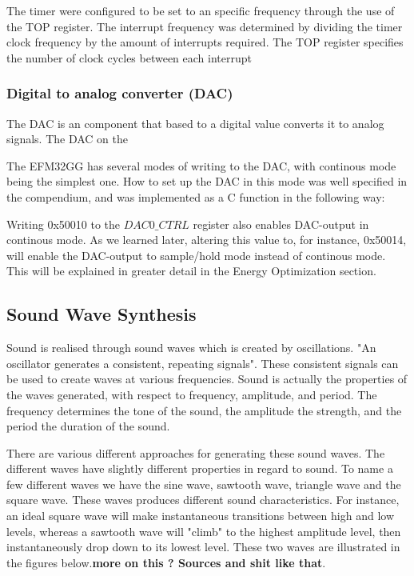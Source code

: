 The timer were configured to be set to an specific frequency through the use of the TOP register. The interrupt frequency was determined by dividing the timer clock frequency by the amount of interrupts required. The TOP register specifies the number of clock cycles between each interrupt


\subsubsection{Digital to analog converter (DAC)}
The DAC is an component that based to a digital value converts it to analog signals. The DAC on the 

The EFM32GG has several modes of writing to the DAC, with continous mode being the simplest one. How to set up the DAC in this mode was well specified in the compendium, and was implemented as a C function in the following way:

Writing 0x50010 to the $DAC0\_CTRL$ register also enables DAC-output in continous mode. As we learned later, altering  this value to, for instance, 0x50014, will enable the DAC-output to sample/hold mode instead of continous mode. This will be explained in greater detail in the Energy Optimization section.

\subsection{Sound Wave Synthesis}

Sound is realised through sound waves which is created by oscillations. "An oscillator generates a consistent, repeating signals". These consistent signals can be used to create waves at various frequencies. Sound is actually the properties of the waves generated, with respect to frequency, amplitude, and period. The frequency determines the tone of the sound, the amplitude the strength, and the period the duration of the sound.

There are various different approaches for generating these sound waves. The different waves have slightly different properties in regard to sound. To name a few different waves we have the sine wave, sawtooth wave, triangle wave and the square wave. These waves produces different sound characteristics. For instance, an ideal square wave will make instantaneous transitions between high and low levels, whereas a sawtooth wave will "climb" to the highest amplitude level, then instantaneously drop down to its lowest level. These two waves are illustrated in the figures below.{\bf more on this ? Sources and shit like that}. 

